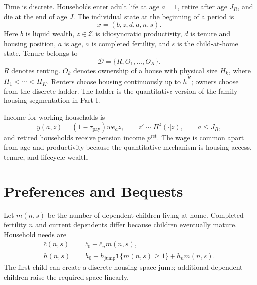 \documentclass[11pt]{article}
\newcommand{\1}{\mathbf 1}
\newcommand{\Dset}{\mathcal D}
\newcommand{\Zset}{\mathcal Z}
\begin{document}
Time is discrete. Households enter adult life at age $a=1$, retire after age
$J_R$, and die at the end of age $J$. The individual state at the beginning of a
period is
\begin{equation}
x=(b,z,d,a,n,s).
\label{eq:quant_state}
\end{equation}
Here $b$ is liquid wealth, $z\in\Zset$ is idiosyncratic productivity, $d$ is
tenure and housing position, $a$ is age, $n$ is completed fertility, and $s$ is
the child-at-home state. Tenure belongs to
\begin{equation}
\Dset=\{R,O_1,\ldots,O_K\}.
\label{eq:quant_tenure_set}
\end{equation}
$R$ denotes renting. $O_k$ denotes ownership of a house with physical size
$H_k$, where $H_1<\cdots<H_K$. Renters choose housing continuously up to
$\bar h^R$; owners choose from the discrete ladder. The ladder is the
quantitative version of the family-housing segmentation in Part I.

Income for working households is
\begin{equation}
y(a,z)=(1-\tau_{\mathrm{pay}})w e_a z,
\qquad
z'\sim \Pi^z(\cdot|z),
\qquad
a\le J_R,
\label{eq:quant_income}
\end{equation}
and retired households receive pension income $p^{\mathrm{ret}}$. The wage is
common apart from age and productivity because the quantitative mechanism is
housing access, tenure, and lifecycle wealth.

\section{Preferences and Bequests}

Let $m(n,s)$ be the number of dependent children living at home. Completed
fertility $n$ and current dependents differ because children eventually mature.
Household needs are
\begin{equation}
\begin{aligned}
\bar c(n,s)&=\bar c_0+\bar c_n m(n,s),\\
\bar h(n,s)&=\bar h_0
+\bar h_{\mathrm{jump}}\1\{m(n,s)\ge1\}
+\bar h_n m(n,s).
\end{aligned}
\label{eq:quant_child_needs}
\end{equation}
The first child can create a discrete housing-space jump; additional dependent
children raise the required space linearly.
\end{document}
